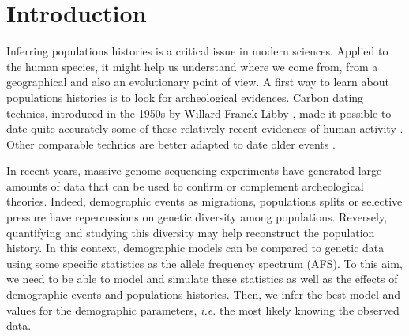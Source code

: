 \section{Introduction}
Inferring populations histories is a critical issue in modern sciences. Applied to the human species, it might help us understand where we come from, from a geographical and also an evolutionary point of view.
A first way to learn about populations histories is to look for archeological evidences. Carbon dating technics, introduced in the 1950s by Willard Franck Libby \cite{libby1949}, made it possible to date quite accurately some of these relatively recent evidences of human activity \cite{valladas2001}. Other comparable technics are better adapted to date older events \cite{walter1994}.

In recent years, massive genome sequencing experiments have generated large amounts of data that can be used to confirm or complement archeological theories. Indeed, demographic events as migrations, populations splits or selective pressure have repercussions on genetic diversity among populations. Reversely, quantifying and studying this diversity may help reconstruct the population history. In this context, demographic models can be compared to genetic data using some specific statistics as the allele frequency spectrum (AFS). To this aim, we need to be able to model and simulate these statistics as well as the effects of demographic events and populations histories. Then, we infer the best model and values for the demographic parameters, \textit{i.e.} the most likely knowing the observed data.

